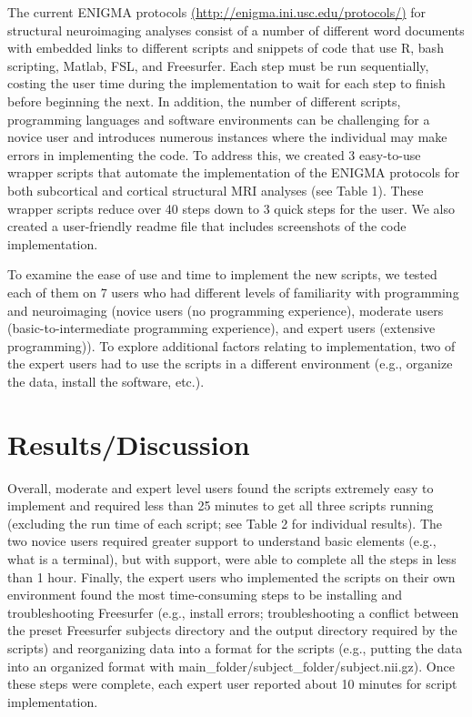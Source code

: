 \documentclass[twocolumn]{bmcart}%
\begin{document}
The current ENIGMA protocols \url{(http://enigma.ini.usc.edu/protocols/)} for
structural neuroimaging analyses consist of a number of different word
documents with embedded links to different scripts and snippets of code
that use R, bash scripting, Matlab, FSL, and Freesurfer. Each step must
be run sequentially, costing the user time during the implementation to
wait for each step to finish before beginning the next. In addition, the
number of different scripts, programming languages and software
environments can be challenging for a novice user and introduces
numerous instances where the individual may make errors in implementing
the code. To address this, we created 3 easy-to-use wrapper scripts
that automate the implementation of the ENIGMA protocols for both
subcortical and cortical structural MRI analyses (see Table 1). These wrapper scripts
reduce over 40 steps down to 3 quick steps for the user. We also created
a user-friendly readme file that includes screenshots of the code
implementation.

To examine the ease of use and time to implement the new scripts, we
tested each of them on 7 users who had different levels of familiarity
with programming and neuroimaging (novice users (no programming
experience), moderate users (basic-to-intermediate programming
experience), and expert users (extensive programming)). To explore
additional factors relating to implementation, two of the expert users
had to use the scripts in a different environment (e.g., organize the
data, install the software, etc.).

\section{Results/Discussion}\label{resultsdiscussion}

Overall, moderate and expert level users found the scripts extremely
easy to implement and required less than 25 minutes to get all three
scripts running (excluding the run time of each script; see Table 2 for
individual results). The two novice users required greater support to
understand basic elements (e.g., what is a terminal), but with support,
were able to complete all the steps in less than 1 hour. Finally, the expert users who implemented the scripts on their own environment found the most time-consuming steps to be installing and troubleshooting Freesurfer (e.g., install errors; troubleshooting a conflict between the preset Freesurfer subjects directory and the output directory required by the scripts) and reorganizing data into a format for the scripts (e.g., putting the data into an organized format with main\_folder/subject\_folder/subject.nii.gz). Once these steps were complete, each expert user reported about 10 minutes for script implementation.
\end{document}
